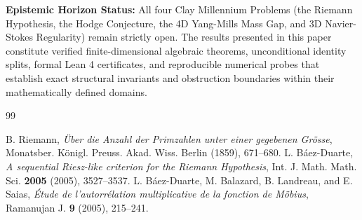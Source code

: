 \documentclass[11pt,a4paper]{article}
\theoremstyle{definition}
\begin{document}
\vspace{0.5em}
\noindent\textbf{Epistemic Horizon Status:} All four Clay Millennium Problems (the Riemann Hypothesis, the Hodge Conjecture, the 4D Yang-Mills Mass Gap, and 3D Navier-Stokes Regularity) remain strictly open. The results presented in this paper constitute verified finite-dimensional algebraic theorems, unconditional identity splits, formal Lean 4 certificates, and reproducible numerical probes that establish exact structural invariants and obstruction boundaries within their mathematically defined domains.

\begin{thebibliography}{99}

 B. Riemann, \emph{\"Uber die Anzahl der Primzahlen unter einer gegebenen Gr\"osse}, Monatsber. K\"onigl. Preuss. Akad. Wiss. Berlin (1859), 671--680.
 L. B\'aez-Duarte, \emph{A sequential Riesz-like criterion for the Riemann Hypothesis}, Int. J. Math. Math. Sci. \textbf{2005} (2005), 3527--3537.
 L. B\'aez-Duarte, M. Balazard, B. Landreau, and E. Saias, \emph{\'Etude de l'autorr\'elation multiplicative de la fonction de M\"obius}, Ramanujan J. \textbf{9} (2005), 215--241.

\end{thebibliography}
\end{document}
